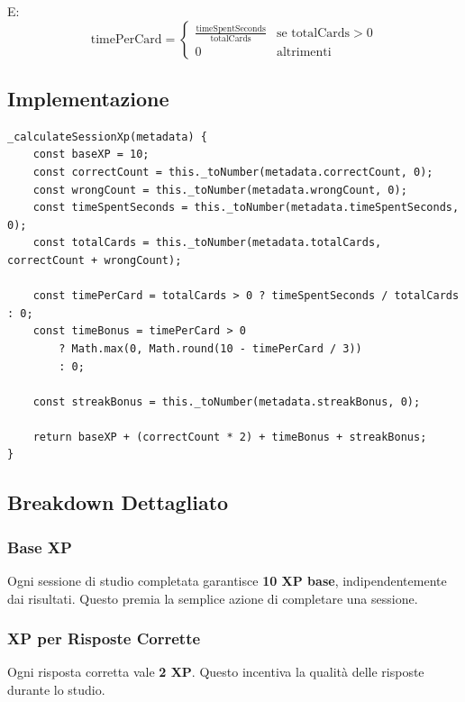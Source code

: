 \documentclass[11pt,a4paper]{article}
\begin{document}
E:
\begin{equation}
\text{timePerCard} = \begin{cases}
\frac{\text{timeSpentSeconds}}{\text{totalCards}} & \text{se } \text{totalCards} > 0 \\
0 & \text{altrimenti}
\end{cases}
\end{equation}

\subsection{Implementazione}

\begin{lstlisting}
_calculateSessionXp(metadata) {
    const baseXP = 10;
    const correctCount = this._toNumber(metadata.correctCount, 0);
    const wrongCount = this._toNumber(metadata.wrongCount, 0);
    const timeSpentSeconds = this._toNumber(metadata.timeSpentSeconds, 0);
    const totalCards = this._toNumber(metadata.totalCards, correctCount + wrongCount);

    const timePerCard = totalCards > 0 ? timeSpentSeconds / totalCards : 0;
    const timeBonus = timePerCard > 0
        ? Math.max(0, Math.round(10 - timePerCard / 3))
        : 0;

    const streakBonus = this._toNumber(metadata.streakBonus, 0);

    return baseXP + (correctCount * 2) + timeBonus + streakBonus;
}
\end{lstlisting}

\subsection{Breakdown Dettagliato}

\subsubsection{Base XP}

Ogni sessione di studio completata garantisce \textbf{10 XP base}, indipendentemente dai risultati. Questo premia la semplice azione di completare una sessione.

\subsubsection{XP per Risposte Corrette}

Ogni risposta corretta vale \textbf{2 XP}. Questo incentiva la qualità delle risposte durante lo studio.
\end{document}
